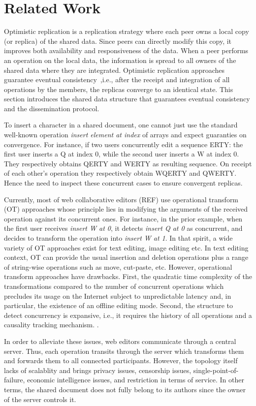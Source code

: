 \section{Related Work}
\label{sec:relatedwork}

Optimistic replication is a replication strategy where each peer owns a local
copy (or replica) of the shared data. Since peers can directly modify this copy,
it improves both availability and responsiveness of the data. When a peer
performs an operation on the local data, the information is spread to all owners
of the shared data where they are integrated. Optimistic replication approaches
guarantee eventual consistency~\cite{bailis2013eventual},i.e., after the
receipt and integration of all operations by the members, the replicas converge
to an identical state. This section introduces the shared data structure that
guarantees eventual consistency and the dissemination protocol.

To insert a character in a shared document, one cannot just use the standard
well-known operation \emph{insert element at index} of arrays and expect
guaranties on convergence. For instance, if two users concurrently edit a
sequence ERTY: the first user inserts a Q at index 0, while the second user
inserts a W at index 0. They respectively obtains QERTY and WERTY as resulting
sequence. On receipt of each other's operation they respectively obtain WQERTY
and QWERTY. Hence the need to inspect these concurrent cases to ensure
convergent replicas.

Currently, most of web collaborative editors (REF) use operational transform
(OT) approaches whose principle lies in modifying the arguments of the received
operation against its concurrent ones. For instance, in the prior example, when
the first user receives \emph{insert W at 0}, it detects \emph{insert Q at 0} as
concurrent, and decides to transform the operation into \emph{insert W at 1}.
In that spirit, a wide variety of OT approaches exist for text editing, image
editing etc. In text editing context, OT can provide the usual insertion and
deletion operations plus a range of string-wise operations such as move,
cut-paste, etc. However, operational transform approaches have drawbacks. First,
the quadratic time complexity of the transformations compared to the number of
concurrent operations which precludes its usage on the Internet subject to
unpredictable latency and, in particular, the existence of an offline editing
mode. Second, the structure to detect concurrency is expansive, i.e., it
requires the history of all operations and a causality tracking
mechanism. .

In order to alleviate these issues, web editors communicate through a central
server. Thus, each operation transits through the server which transforms them
and forwards them to all connected participants. However, the topology itself
lacks of scalablity and brings privacy issues, censorship issues,
single-point-of-failure, economic intelligence issues, and restriction in terms
of service. In other terms, the shared document does not fully belong to its
authors since the owner of the server controls it.

